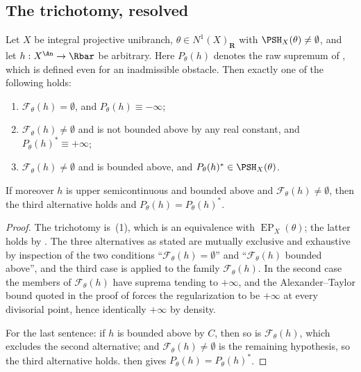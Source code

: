 \subsection{The trichotomy, resolved}
\label{sec:ch45-trichotomy}

\begin{proposition}
\label{prop:ch45-trichotomy}
Let $X$ be integral projective unibranch, $\theta\in N^1(X)_{\mathbf R}$
with $\PSH_X(\theta)\ne\emptyset$, and let
$h:X^{\An}\to\Rbar$ be arbitrary.  Here $P_\theta(h)$ denotes the raw supremum of
, which is defined even for an
inadmissible obstacle.  Then exactly one of the following holds:
\begin{enumerate}
\item $\mathcal F_\theta(h)=\emptyset$, and $P_\theta(h)\equiv-\infty$;
\item $\mathcal F_\theta(h)\ne\emptyset$ and is not bounded above by any real
      constant, and $P_\theta(h)^*\equiv+\infty$;
\item $\mathcal F_\theta(h)\ne\emptyset$ and is bounded above, and
      $P_\theta(h)^*\in\PSH_X(\theta)$.
\end{enumerate}
If moreover $h$ is upper semicontinuous and bounded above and
$\mathcal F_\theta(h)\ne\emptyset$, then the third alternative holds and
$P_\theta(h)=P_\theta(h)^*$.
\end{proposition}

\begin{proof}
The trichotomy is \,(1), which is an
equivalence with $\operatorname{EP}_X(\theta)$; the latter holds by
.  The three alternatives as stated are mutually
exclusive and exhaustive by inspection of the two conditions
``$\mathcal F_\theta(h)=\emptyset$'' and ``$\mathcal F_\theta(h)$ bounded above'', and
the third case is  applied to the family
$\mathcal F_\theta(h)$.  In the second case the members of $\mathcal F_\theta(h)$ have
suprema tending to $+\infty$, and the Alexander--Taylor bound quoted in
the proof of  forces the regularization
to be $+\infty$ at every divisorial point, hence identically $+\infty$
by density.

For the last sentence: if $h$ is bounded above by $C$, then so is
$\mathcal F_\theta(h)$, which excludes the second alternative; and
$\mathcal F_\theta(h)\ne\emptyset$ is the remaining hypothesis, so the third
alternative holds.   then gives
$P_\theta(h)=P_\theta(h)^*$.
\end{proof}

